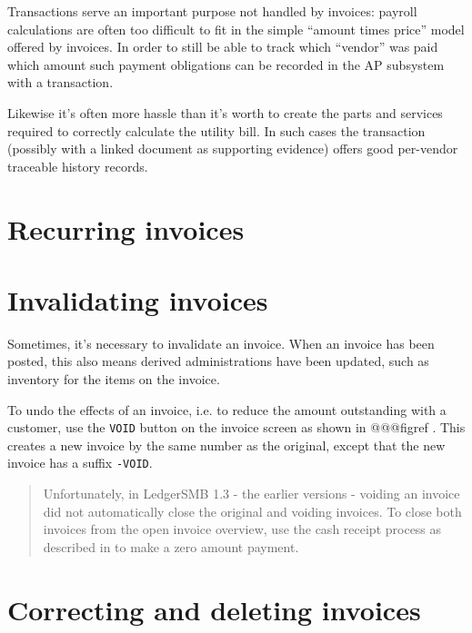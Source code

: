 
Transactions serve an important purpose not handled by invoices: payroll
calculations are often too difficult to fit in the simple ``amount times price''
model offered by invoices. In order to still be able to track which ``vendor''
was paid which amount such payment obligations can be recorded in the AP subsystem
with a transaction.

Likewise it's often more hassle than it's worth to create the parts and services
required to correctly calculate the utility bill. In such cases the transaction
(possibly with a linked document as supporting evidence) offers good per-vendor
traceable history records.


\section{Recurring invoices}
\label{sec-business-processes-invoicing-recurring}


\section{Invalidating invoices}
\label{sec-business-processes-invoicing-invalidation}

Sometimes, it's necessary to invalidate an invoice. When an invoice has been
posted, this also means derived administrations have been updated, such as
inventory for the items on the invoice.

To undo the effects of an invoice, i.e. to reduce the amount outstanding with a
\gls{customer}, use the \texttt{VOID} button on the invoice screen as shown in @@@figref .
This creates a new invoice by the same number as the original, except that the new
invoice has a suffix \texttt{-VOID}.

\begin{quotation}
Unfortunately, in LedgerSMB 1.3 - the earlier versions - voiding an invoice did not
automatically close the original and voiding invoices.  To close both invoices from
the open invoice overview, use the cash receipt process as described in
 to make a zero amount payment.
\end{quotation}

\section{Correcting and deleting invoices}
\label{sec-business-processes-invoicing-correction-or-deletion}

